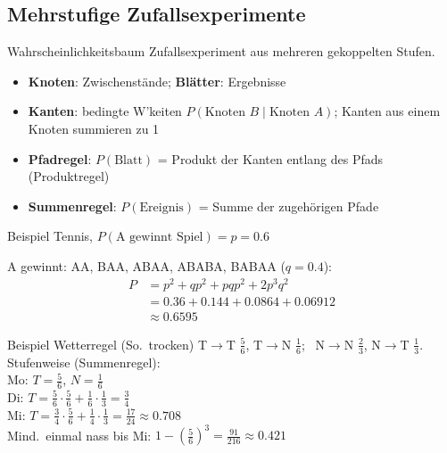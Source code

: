 \documentclass[a4paper, fontsize=7pt]{scrartcl}
\begin{document}
\subsection{Mehrstufige Zufallsexperimente}

\begin{mainbox}{Wahrscheinlichkeitsbaum}
Zufallsexperiment aus mehreren gekoppelten Stufen.
\begin{itemize}
    \item \textbf{Knoten}: Zwischenstände; \textbf{Blätter}: Ergebnisse
    \item \textbf{Kanten}: bedingte W'keiten $P(\text{Knoten } B \mid
          \text{Knoten } A)$; Kanten aus einem Knoten summieren zu 1
    \item \textbf{Pfadregel}: $P(\text{Blatt})$ = Produkt der Kanten
          entlang des Pfads (Produktregel)
    \item \textbf{Summenregel}: $P(\text{Ereignis})$ = Summe der
          zugehörigen Pfade
\end{itemize}
\end{mainbox}

\begin{subbox}{Beispiel Tennis, $P(\text{A gewinnt Spiel}) = p = 0.6$}
\begin{center}
\end{center}
A gewinnt: AA, BAA, ABAA, ABABA, BABAA ($q = 0.4$):
\begin{align*}
P &= p^2 + qp^2 + pqp^2 + 2p^3q^2\\
  &= 0.36 + 0.144 + 0.0864 + 0.06912\\
  &\approx 0.6595
\end{align*}
\end{subbox}

\begin{subbox}{Beispiel Wetterregel (So.\ trocken)}
T$\to$T $\frac{5}{6}$, T$\to$N $\frac{1}{6}$; \ N$\to$N $\frac{2}{3}$,
N$\to$T $\frac{1}{3}$. Stufenweise (Summenregel):\\
Mo: $T = \frac{5}{6}$, $N = \frac{1}{6}$\\
Di: $T = \frac{5}{6}\cdot\frac{5}{6} + \frac{1}{6}\cdot\frac{1}{3} =
\frac{3}{4}$\\
Mi: $T = \frac{3}{4}\cdot\frac{5}{6} + \frac{1}{4}\cdot\frac{1}{3} =
\frac{17}{24} \approx 0.708$\\
Mind.\ einmal nass bis Mi: $1 - \left(\frac{5}{6}\right)^3 =
\frac{91}{216} \approx 0.421$
\end{subbox}
\end{document}
